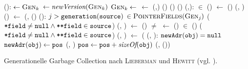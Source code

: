 \begin{algorithm}
\begin{algorithmic}[1]
	\State {}():
	\State \quad {} $\gets \textsc{Gen}_k$
	\State \quad {} $\gets \textit{newVersion}(\textsc{Gen}_k)$
	\State \quad $\textsc{Gen}_k \gets$ 
	\State \quad {} $\gets$ 
	\State \quad {}(,)
	\State \quad {}()
	\State \quad {}()
	\State \quad {}()
	\Statex
	\State {}(,):
	\State \quad \FOREACH {} $\in$ \Handles()
	\State \quad \quad {} $\gets$ ()
	\State \quad \quad {}(, )
	\State \quad \quad {}() $\gets$ (, ()
	\Statex
	\State {}():
	\State \quad \FOREACH $j > \texttt{generation}(\texttt{source})$
	\State \quad \quad \FOREACH {} $\in \textsc{PointerFields}(\textsc{Gen}_j)$
	\State \quad \quad \quad \IF ($\texttt{*field} \neq \texttt{null} \wedge \texttt{**field} \in \texttt{source}$)
	\State \quad \quad \quad \quad {}(, )
	\State \quad \quad \quad \quad {} $\gets$ ()
	\State \quad \WHILE {} $\neq$ \Null
	\State \quad \quad {} $\gets$ ()
	\State \quad \quad \FOREACH {} $\in$ \Fields()
	\State \quad \quad \quad \IF ($\texttt{*field} \neq \texttt{null} \wedge \texttt{**field} \in \texttt{source}$)
	\State \quad \quad \quad \quad {}(, )
	\State \quad \quad \quad \quad {} $\gets$ (
	\Statex
	\State {}(, ):
	\State \quad \IF $\texttt{newAdr}(\texttt{obj}) = \texttt{null}$
	\State \quad \quad $\texttt{newAdr}(\texttt{obj}) \gets \texttt{pos}$
	\State \quad \quad {}(, )
	\State \quad \quad $\texttt{pos} \gets \texttt{pos} + \textit{sizeOf}(\texttt{obj})$
	\State \quad \quad {}(, ())
\end{algorithmic}
\caption[Generationelle Garbage Collection nach \textsc{Lieberman} und \textsc{Hewitt}]{Generationelle Garbage Collection nach \textsc{Lieberman} und \textsc{Hewitt} (vgl. \cite[S. 421ff]{lieberman1983}).}
\label{algo:lieberman}
\end{algorithm}